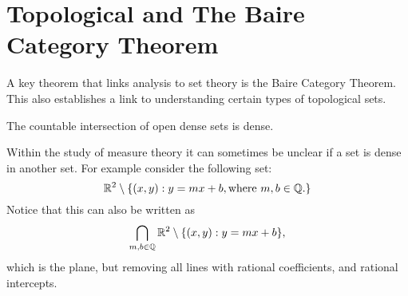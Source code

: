 \section{Topological and The Baire Category Theorem}
A key theorem that links analysis to set theory is the Baire Category Theorem.  This also establishes a link to understanding certain types of topological sets.  
\begin{theorem}
    The countable intersection of open dense sets is dense.  
\end{theorem}

Within the study of measure theory it can sometimes be unclear if a set is dense in another set.  For example consider the following set: 
$$\mathbb{R}^2 \setminus \{(x,y): y=mx + b, \text{where $m, b \in \mathbb{Q}$.}\}$$
Notice that this can also be written as $$\bigcap_{m,b \in \mathbb{Q}} \mathbb{R}^2 \setminus \{(x,y): y=mx+b\}, $$ which is the plane, but removing all lines with rational coefficients, and rational intercepts.  